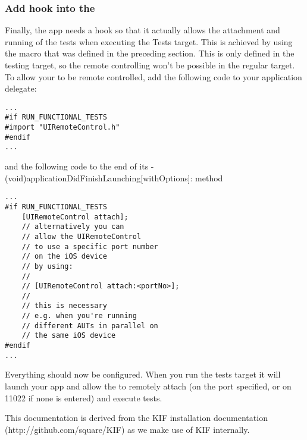 \subsubsection{Add hook into the \gdaut{}}

Finally, the app needs a hook so that it actually allows the attachment and running of the tests when executing the Tests target. 
This is achieved by using the   macro that was defined in the preceding section. This  is only defined in 
the testing target, so the remote controlling won't be possible in the regular target. To allow your \gdaut{} to be remote controlled, add the 
following code to your application delegate:

\begin{verbatim}
...
#if RUN_FUNCTIONAL_TESTS
#import "UIRemoteControl.h"
#endif
...
\end{verbatim}

and the following code to the end of its - (void)applicationDidFinishLaunching[withOptions]: method

\begin{verbatim}
...
#if RUN_FUNCTIONAL_TESTS
    [UIRemoteControl attach];
    // alternatively you can
    // allow the UIRemoteControl 
    // to use a specific port number 
    // on the iOS device 
    // by using:
    // 
    // [UIRemoteControl attach:<portNo>];
    // 
    // this is necessary
    // e.g. when you're running 
    // different AUTs in parallel on 
    // the same iOS device
#endif
...
\end{verbatim}

Everything should now be configured. When you run the \gdaut{} tests target it will launch your app and allow the \ite{} to remotely attach (on the port specified, or on 11022 if none is entered) and execute tests.


This documentation is derived from the KIF installation documentation (http://github.com/square/KIF) as we make use of KIF internally.
